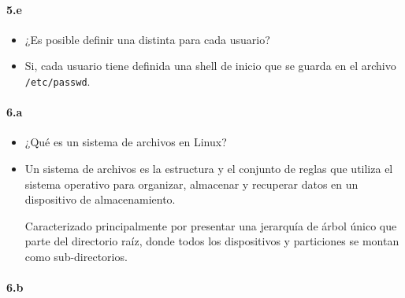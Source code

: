 \documentclass[10pt,a4paper]{paper}
\begin{document}
	\paragraph{5.e}
	
	\begin{itemize}
		\item ¿Es posible definir una distinta para cada usuario?
		
		\item Si, cada usuario tiene definida una shell de inicio que se guarda en el
		archivo \texttt{/etc/passwd}.
	\end{itemize}
	
	
	
	\paragraph{6.a}
	
	
	\begin{itemize}
		\item ¿Qué es un sistema de archivos en Linux?
		
		\item Un sistema de archivos es la estructura y el conjunto de reglas que
		utiliza el sistema operativo para organizar, almacenar y recuperar datos en un
		dispositivo de almacenamiento. 
		
		Caracterizado principalmente por presentar una jerarquía de árbol único que
		parte del directorio raíz, donde todos los dispositivos y particiones se montan
		como sub-directorios. 
	\end{itemize}
	
	
	
	\paragraph{6.b}
	
\end{document}
